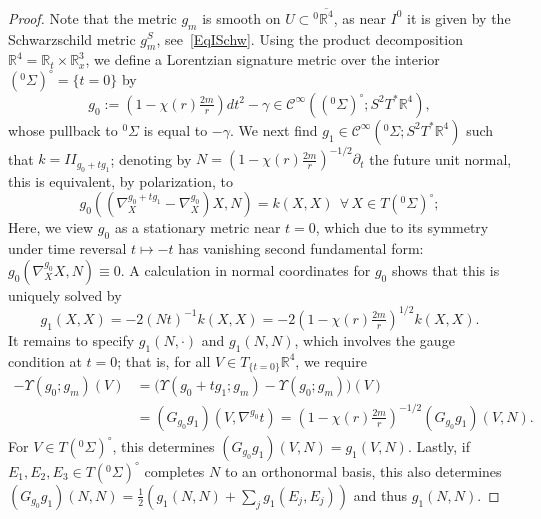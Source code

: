 \documentclass[reqno,11pt,letterpaper]{amsart}
\numberwithin{equation}{section}
\numberwithin{figure}{section}
\theoremstyle{definition}
\theoremstyle{remark}
\newcommand{\mc}{\mathcal}
\newcommand{\cC}{\mc C}
\newcommand{\R}{\mathbb{R}}
\newcommand{\II}{I\!I}
\newcommand{\Ups}{\Upsilon}
\newcommand{\ol}{\overline}
\newcommand{\pa}{\partial}
\newcommand{\half}{\tfrac{1}{2}}
\newcommand{\CI}{\cC^\infty}
\begin{document}
\begin{proof}
  Note that the metric $g_m$ is smooth on $U\subset{}^0\ol{\R^4}$, as near $I^0$ it is given by the Schwarzschild metric $g_m^S$, see~\eqref{EqISchw}. Using the product decomposition $\R^4=\R_t\times\R^3_x$, we define a Lorentzian signature metric over the interior $({}^0\Sigma)^\circ=\{t=0\}$ by
  \begin{equation}
  \label{EqPf0G0}
    g_0 := (1-\chi(r)\tfrac{2 m}{r})d t^2 - \gamma \in \CI(({}^0\Sigma)^\circ;S^2 T^*\R^4),
  \end{equation}
  whose pullback to ${}^0\Sigma$ is equal to $-\gamma$. We next find $g_1\in\CI({}^0\Sigma;S^2 T^*\R^4)$ such that $k=\II_{g_0+t g_1}$; denoting by $N=(1-\chi(r)\tfrac{2 m}{r})^{-1/2}\pa_t$ the future unit normal, this is equivalent, by polarization, to
  \[
    g_0((\nabla_X^{g_0+t g_1}-\nabla_X^{g_0})X,N)=k(X,X)\ \ 
    \forall\,X\in T({}^0\Sigma)^\circ;
  \]
  Here, we view $g_0$ as a stationary metric near $t=0$, which due to its symmetry under time reversal $t\mapsto-t$ has vanishing second fundamental form: $g_0(\nabla_X^{g_0}X,N)\equiv 0$. A calculation in normal coordinates for $g_0$ shows that this is uniquely solved by
  \begin{equation}
  \label{EqPf0G1Spatial}
    g_1(X,X)=-2(N t)^{-1} k(X,X) = -2(1-\chi(r)\tfrac{2 m}{r})^{1/2}k(X,X).
  \end{equation}
  It remains to specify $g_1(N,\cdot)$ and $g_1(N,N)$, which involves the gauge condition at $t=0$; that is, for all $V\in T_{\{t=0\}}\R^4$, we require
  \begin{equation}
  \label{EqPf0G1Rest}
  \begin{split}
    -\Ups(g_0;g_m)(V) &= \bigl(\Ups(g_0+t g_1;g_m)-\Ups(g_0;g_m)\bigr)(V) \\
      &= (G_{g_0}g_1)(V,\nabla^{g_0}t) = (1-\chi(r)\tfrac{2 m}{r})^{-1/2} (G_{g_0}g_1)(V,N).
  \end{split}
  \end{equation}
  For $V\in T({}^0\Sigma)^\circ$, this determines $(G_{g_0}g_1)(V,N)=g_1(V,N)$. Lastly, if $E_1,E_2,E_3\in T({}^0\Sigma)^\circ$ completes $N$ to an orthonormal basis, this also determines $(G_{g_0}g_1)(N,N)=\half(g_1(N,N)+\sum_j g_1(E_j,E_j))$ and thus $g_1(N,N)$.


\end{proof}
\end{document}
